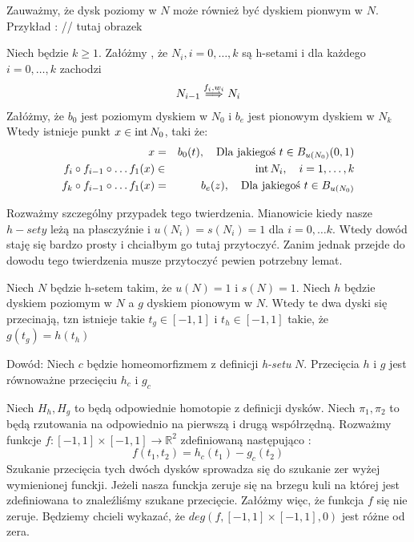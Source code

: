 Zauważmy, że dysk poziomy w $N$ może również być dyskiem pionwym w $N$. Przykład :
// tutaj obrazek

\begin{theorem}
	Niech będzie $k \geq 1 $. Załóżmy , że $N_i, i = 0, \dots ,k $ są h-setami
	i dla każdego $ i = 0, \dots ,k $ zachodzi 
	\begin{eqnarray*}
  		N_{i-1} \stackrel{f_i,w_i}{\Longrightarrow} N_i
	\end{eqnarray*}
	Załóżmy, że $b_0$ jest poziomym dyskiem w $N_0$ i $b_e$ jest pionowym dyskiem
	w $ N_k$ 
	Wtedy istnieje punkt $ x \in {\rm int}\, N_0$, taki  że:
	\begin{eqnarray*}
   	x&=&b_0(t), \quad \mbox{Dla jakiegoś } t \in B_{u(N_0)}(0,1) \\
    f_i \circ f_{i-1} \circ \dots f_1(x) &\in &{\rm int}\, N_i, \quad i = 1, \dots , k \\
    f_k \circ f_{i-1} \circ \dots f_1(x) &=& b_e(z) ,\quad \mbox{Dla jakiegoś } t \in B_{u(N_0)}
\end{eqnarray*}
\end{theorem}

Rozważmy szczególny przypadek tego twierdzenia. Mianowicie kiedy nasze $h-sety$ leżą na
płasczyźnie i $u(N_i) = s(N_i) =1 $ dla $ i=0, \dots k $. Wtedy dowód staję się bardzo
prosty i chciałbym go tutaj przytoczyć. Zanim jednak przejde do dowodu tego twierdzenia musze przytoczyć pewien potrzebny lemat.

\begin{lemma}
  Niech $ N $ będzie h-setem takim, że $ u(N) = 1 $ i $ s(N) = 1 $.
  Niech $ h $ będzie dyskiem poziomym w $ N $ a $ g $ dyskiem pionowym w $ N $.
  Wtedy te dwa dyski się przecinają, tzn istnieje takie $ t_g \in [-1,1] $ i $ t_h \in [-1,1] $
  takie, że $ g(t_g) = h(t_h) $
 \end{lemma}
  Dowód:
  \newline
  Niech $ c $ będzie homeomorfizmem z definicji {\em h-setu } $ N $.
  Przecięcia $ h $ i $ g $ jest równoważne przecięciu $ h_c $ i $ g_c $ 
  
  Niech $H_h, H_g $ to będą odpowiednie homotopie z definicji dysków.
  Niech $ \pi_1,\pi_2 $ to będą rzutowania na odpowiednio na pierwszą i drugą współrzędną.	
  Rozważmy funkcje $ f : [-1,1] \times [-1,1] \to \mathbb R^2 $ zdefiniowaną następująco :
  \begin{equation}
    f(t_1,t_2) = h_c(t_1) - g_c(t_2)
  \end{equation}
  Szukanie przecięcia tych dwóch dysków sprowadza się do szukanie zer wyżej wymienionej funckji.
  Jeżeli nasza funckja zeruje się na brzegu kuli na której jest zdefiniowana to znaleźliśmy szukane przecięcie.
  Załóżmy więc, że funkcja $f$ się nie zeruje. Będziemy chcieli wykazać, że $ deg(f,[-1,1]\times [-1,1],0) $ jest różne od zera.
 
